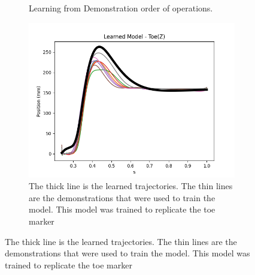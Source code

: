 \begin{figure}[h!]
\begin{subfigure}{0.4\linewidth}
        \caption{Learning from Demonstration order of operations.}
        \label{fig:flowchart}
    \end{subfigure}
    \begin{subfigure}{0.4\linewidth} 
        \centering
        \captionsetup{justification=centering}
        \centerline{
        \includegraphics[scale=0.50]{images/software/learnedZ.png}}
        \caption{The thick line is the learned trajectories. The thin lines are the demonstrations that were used to train the model. This model was trained to replicate the toe marker}
        \label{fig:learned}
    \end{subfigure}
    \label{fig:LFDexample}
\end{figure}



